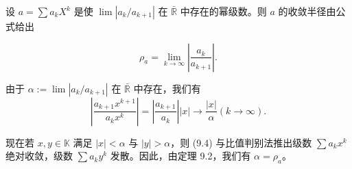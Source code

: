 \begin{proposition}

设  $ a = \sum a_k X^k $ 是使  $ \lim |a_k / a_{k+1}| $ 在  $ \bar{\mathbb{R}} $ 中存在的幂级数。则  $ a $ 的收敛半径由公式给出

\[
\rho_{a}=\lim_{k\to\infty}\left|\frac{a_{k}}{a_{k+1}}\right|.
\]

\proofhead
由于  $ \alpha := \lim |a_k/a_{k+1}| $ 在  $ \bar{\mathbb{R}} $ 中存在，我们有
\begin{equation}
\left|\frac{a_{k+1}x^{k+1}}{a_{k}x^{k}}\right|=\left|\frac{a_{k+1}}{a_{k}}\right|\left|x\right|\rightarrow\frac{\left|x\right|}{\alpha}\left(k\rightarrow\infty\right).
\end{equation}

现在若 $x, y \in \mathbb{K}$ 满足 $|x| < \alpha$ 与 $|y| > \alpha$，则 (9.4) 与比值判别法推出级数 $\sum a_k x^k$ 绝对收敛，级数 $\sum a_k y^k$ 发散。因此，由定理 9.2，我们有 $\alpha = \rho_a$。

\end{proposition}


